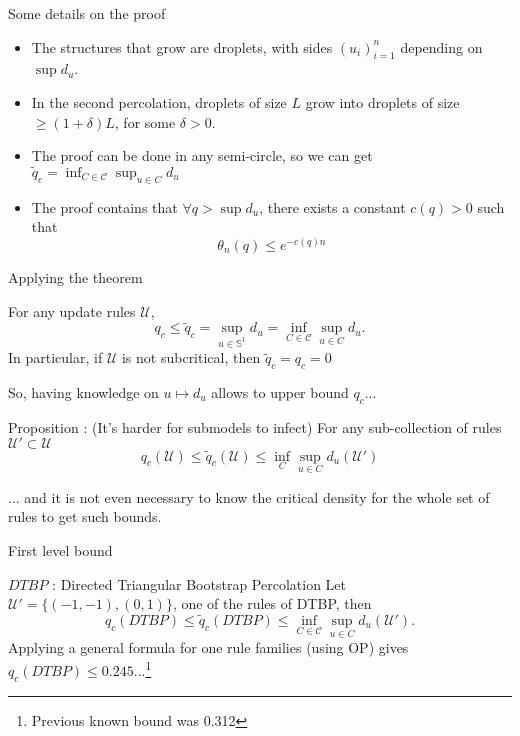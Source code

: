 \documentclass{beamer}
\begin{document}
\begin{frame}{Some details on the proof}
	\begin{itemize}
		\item The structures that grow are droplets, with sides $(u_i)_{i=1}^n$ depending on $\sup d_u$.
		\item In the second percolation, droplets of size $L$ grow into droplets of size $\geq (1+\delta)L$, for some $\delta > 0$.
		\item The proof can be done in any semi-circle, so we can get $\tilde q_c = \inf_{C\in\mathcal{C}}\sup_{u\in C} d_u$
		\item The proof contains that $\forall q> \sup d_u$, there exists a constant $c(q)>0$ such that
			\begin{equation*}
				\theta_n(q) \leq e^{-c(q)n}
			\end{equation*}
	\end{itemize}
\end{frame}

\begin{frame}{Applying the theorem}
	\begin{theorem}
		For any update rules $\mathcal{U}$,
		\begin{equation*}
			q_c \leq \tilde q_c = \sup_{u\in\mathbb{S}^1} d_u = \inf_{C\in\mathcal{C}} \sup_{u\in C} d_u.
		\end{equation*}
		In particular, if $\mathcal{U}$ is not subcritical, then $\tilde q_c = q_c = 0$ 
	\end{theorem}
	So, having knowledge on $u\mapsto d_u$ allows to upper bound $q_c$...
	\begin{block}{Proposition : (It's harder for submodels to infect)}
		For any sub-collection of rules $\mathcal{U}'\subset \mathcal{U}$
		\begin{equation*}
			q_c(\mathcal{U}) \leq \tilde q_c (\mathcal{U}) \leq \inf_C \sup_{u\in C} d_u(\mathcal{U'})
		\end{equation*}
	\end{block}
	... and it is not even necessary to know the critical density for the whole set of rules to get such bounds.
\end{frame}

\begin{frame}{First level bound}
	\begin{block}{$DTBP$ : Directed Triangular Bootstrap Percolation}
		Let $\mathcal{U}' = \{(-1, -1), (0,1)\}$, one of the rules of DTBP, then
		\begin{equation*}
			q_c(DTBP) \leq \tilde q_c(DTBP) \leq \inf_{C\in\mathcal{C}} \sup_{u\in C} d_u(\mathcal{U}').
		\end{equation*}
		Applying a general formula for one rule families (using OP) gives $q_c(DTBP) \leq 0.245...$\footnote{Previous known bound was 0.312}
	\end{block}
\end{frame}
\end{document}
